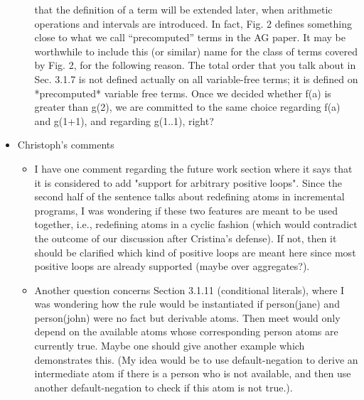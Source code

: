 \begin{itemize}
\begin{itemize}
  that the definition of a term will be extended later, when arithmetic
  operations and intervals are introduced.  In fact, Fig. 2 defines something
  close to what we call “precomputed” terms in the AG paper.  It may be
  worthwhile to include this (or similar) name for the class of terms covered
  by Fig. 2, for the following reason.  The total order that you talk about
  in Sec. 3.1.7 is not defined actually on all variable-free terms; it is
  defined on *precomputed* variable free terms.  Once we decided whether f(a)
  is greater than g(2), we are committed to the same choice regarding f(a)
  and g(1+1), and regarding g(1..1), right?
  \end{itemize}
\item Christoph's comments
  \begin{itemize}
  \item 
    I have one comment regarding the future work section where it says that it
    is considered to add "support for arbitrary positive loops". Since the
    second half of the sentence talks about redefining atoms in incremental
    programs, I was wondering if these two features are meant to be used
    together, i.e., redefining atoms in a cyclic fashion (which would
    contradict the outcome of our discussion after Cristina's defense). If not,
    then it should be clarified which kind of positive loops are meant here
    since most positive loops are already supported (maybe over aggregates?).
  \item 
    Another question concerns Section 3.1.11 (conditional literals), where I
    was wondering how the rule would be instantiated if person(jane) and
    person(john) were no fact but derivable atoms. Then meet would only depend
    on the available atoms whose corresponding person atoms are currently true.
    Maybe one should give another example which demonstrates this. (My idea
    would be to use default-negation to derive an intermediate atom if there is
    a person who is not available, and then use another default-negation to
    check if this atom is not true.).
\end{itemize}
\end{itemize}

